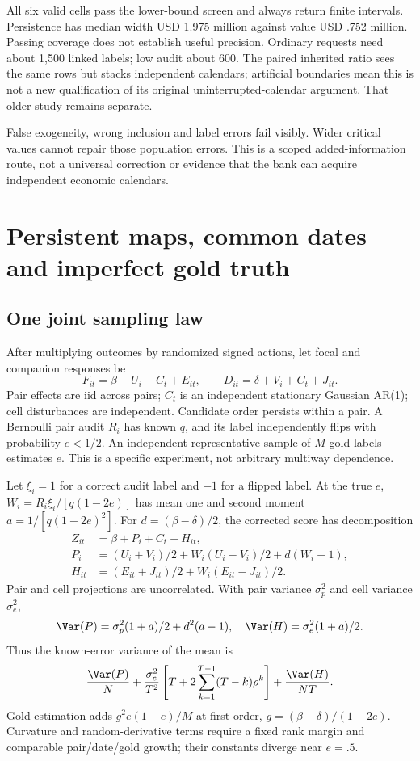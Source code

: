 All six valid cells pass the lower-bound screen and always return finite intervals. Persistence has median width USD 1.975 million against value USD .752 million. Passing coverage does not establish useful precision. Ordinary requests need about 1,500 linked labels; low audit about 600. The paired inherited ratio sees the same rows but stacks independent calendars; artificial boundaries mean this is not a new qualification of its original uninterrupted-calendar argument. That older study remains separate.

False exogeneity, wrong inclusion and label errors fail visibly. Wider critical values cannot repair those population errors. This is a scoped added-information route, not a universal correction or evidence that the bank can acquire independent economic calendars.

\section{Persistent maps, common dates and imperfect gold truth}
\subsection{One joint sampling law}
After multiplying outcomes by randomized signed actions, let focal and companion responses be
\[
 F_{it}=\beta+U_i+C_t+E_{it},\qquad D_{it}=\delta+V_i+C_t+J_{it}.
\]
Pair effects are iid across pairs; $C_t$ is an independent stationary Gaussian AR(1); cell disturbances are independent. Candidate order persists within a pair. A Bernoulli pair audit $R_i$ has known $q$, and its label independently flips with probability $e<1/2$. An independent representative sample of $M$ gold labels estimates $e$. This is a specific experiment, not arbitrary multiway dependence.

Let $\xi_i=1$ for a correct audit label and $-1$ for a flipped label. At the true $e$, $W_i=R_i\xi_i/[q(1-2e)]$ has mean one and second moment $a=1/[q(1-2e)^2]$. For $d=(\beta-\delta)/2$, the corrected score has decomposition
\begin{align*}
 Z_{it}&=\beta+P_i+C_t+H_{it},\\
 P_i&=(U_i+V_i)/2+W_i(U_i-V_i)/2+d(W_i-1),\\
 H_{it}&=(E_{it}+J_{it})/2+W_i(E_{it}-J_{it})/2.
\end{align*}
Pair and cell projections are uncorrelated. With pair variance $\sigma_p^2$ and cell variance $\sigma_e^2$,
\[
 \Var(P)=\sigma_p^2(1+a)/2+d^2(a-1),\quad
 \Var(H)=\sigma_e^2(1+a)/2.
\]
Thus the known-error variance of the mean is
\[
 \frac{\Var(P)}N+\frac{\sigma_c^2}{T^2}\left[T+2\sum_{k=1}^{T-1}(T-k)\rho^k\right]+\frac{\Var(H)}{NT}.
\]
Gold estimation adds $g^2e(1-e)/M$ at first order, $g=(\beta-\delta)/(1-2e)$. Curvature and random-derivative terms require a fixed rank margin and comparable pair/date/gold growth; their constants diverge near $e=.5$.


